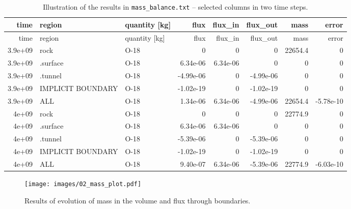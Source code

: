 \begin{longtable}[c]{@{}rllrrrrr@{}}
\caption{Illustration of the results in \texttt{mass\_balance.txt} --
selected columns in two time steps.
\label{tbl:mass_balance}}\tabularnewline
\toprule
time & region & quantity {[}kg{]} & flux & flux\_in & flux\_out & mass &
error\tabularnewline
\midrule
\endfirsthead
\toprule
time & region & quantity {[}kg{]} & flux & flux\_in & flux\_out & mass &
error\tabularnewline
\midrule
\endhead
3.9e+09 & rock & O-18 & 0 & 0 & 0 & 22654.4 & 0\tabularnewline
3.9e+09 & .surface & O-18 & 6.34e-06 & 6.34e-06 & 0 & 0 &
0\tabularnewline
3.9e+09 & .tunnel & O-18 & -4.99e-06 & 0 & -4.99e-06 & 0 &
0\tabularnewline
3.9e+09 & IMPLICIT BOUNDARY & O-18 & -1.02e-19 & 0 & -1.02e-19 & 0 &
0\tabularnewline
3.9e+09 & ALL & O-18 & 1.34e-06 & 6.34e-06 & -4.99e-06 & 22654.4 &
-5.78e-10\tabularnewline
4e+09 & rock & O-18 & 0 & 0 & 0 & 22774.9 & 0\tabularnewline
4e+09 & .surface & O-18 & 6.34e-06 & 6.34e-06 & 0 & 0 & 0\tabularnewline
4e+09 & .tunnel & O-18 & -5.39e-06 & 0 & -5.39e-06 & 0 &
0\tabularnewline
4e+09 & IMPLICIT BOUNDARY & O-18 & -1.02e-19 & 0 & -1.02e-19 & 0 &
0\tabularnewline
4e+09 & ALL & O-18 & 9.40e-07 & 6.34e-06 & -5.39e-06 & 22774.9 &
-6.03e-10\tabularnewline
\bottomrule
\end{longtable}

\begin{figure}[htbp]
\centering
\texttt{[image: images/02\_mass\_plot.pdf]}
\caption{Results of evolution of mass in the volume and flux through
boundaries.\label{fig:mass_plot}}
\end{figure}
